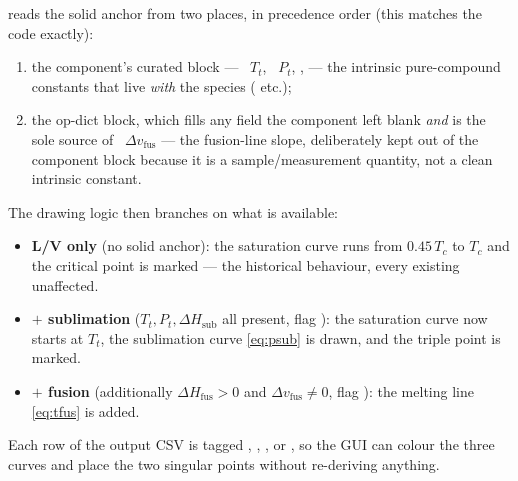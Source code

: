 \documentclass[11pt,a4paper]{article}
\newcommand{\Hsub}{\Delta H_{\!\mathrm{sub}}}
\newcommand{\Hfus}{\Delta H_{\!\mathrm{fus}}}
\begin{document}
 reads the solid anchor from two places, in
precedence order (this matches the code exactly):
\begin{enumerate}[leftmargin=*,nosep]
  \item the component's curated  block ---
        ~$T_t$, ~$P_t$, , 
        --- the intrinsic pure-compound constants that live \emph{with}
        the species ( etc.);
  \item the op-dict  block, which fills any field the
        component left blank \emph{and} is the sole source of
        ~$\Delta v_{\mathrm{fus}}$ --- the fusion-line
        slope, deliberately kept out of the component block because it
        is a sample/measurement quantity, not a clean intrinsic constant.
\end{enumerate}
The drawing logic then branches on what is available:
\begin{itemize}[leftmargin=*,nosep]
  \item \textbf{L/V only} (no solid anchor): the saturation curve runs
        from $0.45\,T_c$ to $T_c$ and the critical point is marked ---
        the historical behaviour, every existing 
        unaffected.
  \item \textbf{$+$ sublimation} ($T_t,P_t,\Hsub$ all present, flag
        ): the saturation curve now starts at $T_t$, the
        sublimation curve \eqref{eq:psub} is drawn, and the triple
        point is marked.
  \item \textbf{$+$ fusion} (additionally $\Hfus>0$ and
        $\Delta v_{\mathrm{fus}}\neq0$, flag ): the
        melting line \eqref{eq:tfus} is added.
\end{itemize}
Each row of the output CSV is tagged , ,
,  or , so the GUI can colour the
three curves and place the two singular points without re-deriving anything.
\end{document}

